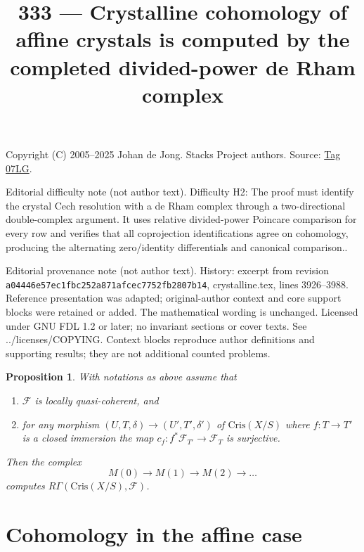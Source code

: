 \documentclass{amsart}
\theoremstyle{plain}
\newtheorem{proposition}[subsection]{Proposition}
\theoremstyle{definition}
\theoremstyle{remark}
\numberwithin{equation}{subsection}
\begin{document}
\title[Stacks Project, Tag 07LG]{333 --- Crystalline cohomology of affine crystals is computed by the completed divided-power de Rham complex}
\maketitle
\noindent Copyright (C) 2005--2025 Johan de Jong. Stacks Project authors. Source: \href{https://stacks.math.columbia.edu/tag/07LG}{Tag 07LG}.

\noindent Editorial difficulty note (not author text). Difficulty H2: The proof must identify the crystal Cech resolution with a de Rham complex through a two-directional double-complex argument. It uses relative divided-power Poincare comparison for every row and verifies that all coprojection identifications agree on cohomology, producing the alternating zero/identity differentials and canonical comparison..

\noindent Editorial provenance note (not author text). History: excerpt from revision \texttt{a0444\allowbreak 6e57e\allowbreak c1fbc\allowbreak 252a8\allowbreak 71afc\allowbreak ec775\allowbreak 2fb28\allowbreak 07b14}, crystalline.tex, lines 3926--3988. Reference presentation was adapted; original-author context and core support blocks were retained or added. The mathematical wording is unchanged. Licensed under GNU FDL 1.2 or later; no invariant sections or cover texts. See ../licenses/COPYING. Context blocks reproduce author definitions and supporting results; they are not additional counted problems.

\begin{proposition}
\label{proposition-compute-cohomology}
With notations as above assume that
\begin{enumerate}
\item $\mathcal{F}$ is locally quasi-coherent, and
\item for any morphism $(U, T, \delta) \to (U', T', \delta')$
of $\text{Cris}(X/S)$ where $f : T \to T'$ is a closed immersion
the map $c_f : f^*\mathcal{F}_{T'} \to \mathcal{F}_T$ is surjective.
\end{enumerate}
Then the complex
$$
M(0) \to M(1) \to M(2) \to \ldots
$$
computes $R\Gamma(\text{Cris}(X/S), \mathcal{F})$.
\end{proposition}

\section{Cohomology in the affine case}
\label{section-cohomology-affine}
\end{document}
